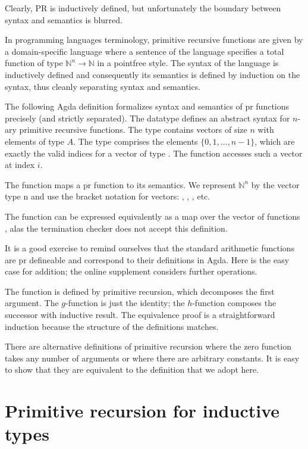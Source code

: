 \documentclass[a4paper,USenglish,cleveref, autoref, thm-restate]{lipics-v2021}
\begin{document}
Clearly, PR is inductively defined, but unfortunately the boundary
between syntax and semantics is blurred.


In programming languages terminology, primitive
recursive functions are given by a domain-specific language where a
sentence of the language specifies a total function of type ${ℕ}^n \to {ℕ}$
in a pointfree style. The syntax of the language is inductively
defined and consequently its semantics is defined by induction on the
syntax, thus cleanly separating syntax and semantics.

The following Agda definition formalizes syntax and semantics of pr
functions precisely (and strictly separated).
The datatype  defines an abstract syntax for $n$-ary primitive recursive functions.
The type  contains vectors of size $n$ with elements of type $A$.
The type  comprises the elements $\{0, 1, \dots, n-1\}$, which
are exactly the valid indices for a vector of type . 
The function  accesses such a vector at index $i$.

\PRNat

The function  maps a pr function to its semantics.
We represent ${ℕ}^n$ by the vector type n and use the bracket notation for vectors: \Anil, , , etc.

\PRNatEval

The function  can be expressed equivalently as a
map over the vector of functions , alas the termination
checker does not accept this definition.  


It is a good exercise to remind ourselves that the standard arithmetic
functions are pr defineable and correspond to their definitions in
Agda. Here is the easy case for addition; the online supplement
considers further operations. 

\PRNatExampleAdd
The function  is defined by primitive recursion, which
decomposes the first argument. The $g$-function is just the identity;
the $h$-function composes the successor with inductive result.
The equivalence proof is a
straightforward induction because the structure of the definitions
matches.

There are alternative definitions of primitive recursion where the
zero function takes any number of arguments or where there are
arbitrary constants. It is easy to show that they are equivalent to
the definition that we adopt here.

\section{Primitive recursion for inductive types}
\label{sec:prim-recurs-gener}

\end{document}
